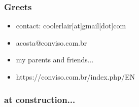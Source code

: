 \documentclass[serif,mathserif]{beamer}
\begin{document}

\begin{frame}
  \frametitle{Greets}
  \begin{itemize}
  \item contact: coolerlair[at]gmail[dot]com 
  \item acosta@conviso.com.br
  \item my parents and friends...
  \item https://conviso.com.br/index.php/EN
  \end{itemize}
\end{frame}

\begin{frame}
  \frametitle{at construction...}
\end{frame}
\end{document}
